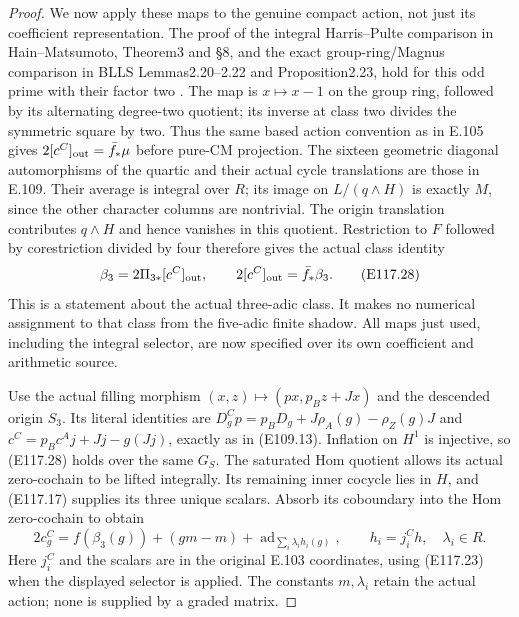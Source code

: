 \begin{proof}
We now apply these maps to the genuine compact action,
not just its coefficient representation.  The proof of
the integral Harris--Pulte comparison in Hain--Matsumoto,
Theorem3 and \S8, and the exact group-ring/Magnus comparison
in BLLS Lemmas2.20--2.22 and Proposition2.23, hold for this
odd prime with their factor two
\cite{E109_HainMatsumoto,E109_BisognoLiLittSrinivasan}.
The map is $x\mapsto x-1$ on the group ring, followed by
its alternating degree-two quotient; its inverse at class
two divides the symmetric square by two.
Thus the same based action convention as in E.105 gives
$2[c^C]_{\rm out}=\bar f_*\mu$ before pure-CM projection.
The sixteen geometric diagonal automorphisms of the quartic
and their actual cycle translations are those in E.109.
Their average is integral over $R$; its image on
$L/(q\wedge H)$ is exactly $M$, since the other character
columns are nontrivial.  The origin translation contributes
$q\wedge H$ and hence vanishes in this quotient.
Restriction to $F$ followed by corestriction divided by four
therefore gives the actual class identity
\[
 \beta_3=2\Pi_{3*}[c^C]_{\rm out},\qquad
 2[c^C]_{\rm out}=\bar f_*\beta_3.
 \tag{E117.28}
\]
This is a statement about the actual three-adic class.
It makes no numerical assignment to that class from the
five-adic finite shadow.  All maps just used, including
the integral selector, are now specified over its own
coefficient and arithmetic source.

Use the actual filling morphism
$(x,z)\mapsto(px,p_Bz+Jx)$ and the descended origin $S_3$.
Its literal identities are
$D^C_gp=p_BD_g+J\rho_A(g)-\rho_Z(g)J$ and
$c^C=p_Bc^Aj+Jj-g(Jj)$, exactly as in (E109.13).
Inflation on $H^1$ is injective, so (E117.28) holds over
the same $G_S$.  The saturated Hom quotient allows its
actual zero-cochain to be lifted integrally.  Its remaining
inner cocycle lies in $H$, and (E117.17) supplies its three
unique scalars.  Absorb its coboundary into the Hom
zero-cochain to obtain
\[
 2c^C_g=f(\beta_3(g))+(gm-m)
      +\operatorname{ad}_{\sum_i\lambda_i h_i(g)},
 \qquad h_i=j_i^C h,\quad \lambda_i\in R.
 \tag{E117.29}
\]
Here $j_i^C$ and the scalars are in the original E.103
coordinates, using (E117.23) when the displayed selector
is applied.  The constants $m,\lambda_i$ retain the
actual action; none is supplied by a graded matrix.


\end{proof}
